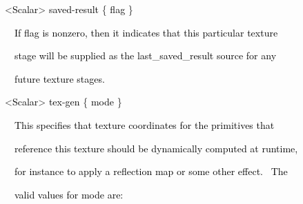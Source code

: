 \documentclass[a4paper]{article}
\newcommand\textstyleOOoComputerKeyWord[1]{\textrm{\textcolor[rgb]{0.0,0.0,0.5019608}{#1}}}
\newcommand\textstyleOOoAssemblerSpecialChar[1]{\textrm{\textcolor[rgb]{0.0,0.5019608,0.0}{#1}}}
\newcommand\textstyleOOoAssemblerIdent[1]{\textrm{\textcolor{black}{#1}}}
\begin{document}
\bigskip

{\color{black}
\textstyleOOoComputerKeyWord{\textcolor{black}{\ \ }}\textstyleOOoAssemblerSpecialChar{{\textless}}\textstyleOOoAssemblerIdent{Scalar}\textstyleOOoAssemblerSpecialChar{{\textgreater}}\textstyleOOoComputerKeyWord{\textcolor{black}{
}}\textstyleOOoAssemblerIdent{saved}\textstyleOOoAssemblerSpecialChar{{}-}\textstyleOOoAssemblerIdent{result}\textstyleOOoComputerKeyWord{\textcolor{black}{
}}\textstyleOOoAssemblerSpecialChar{\{}\textstyleOOoComputerKeyWord{\textcolor{black}{
}}\textstyleOOoAssemblerIdent{flag}\textstyleOOoComputerKeyWord{\textcolor{black}{
}}\textstyleOOoAssemblerSpecialChar{\}}}


\bigskip

{\color{black}
\textstyleOOoComputerKeyWord{\textcolor{black}{\ \ \ \ If flag is nonzero, then it indicates that this particular
texture}}}

{\color{black}
\textstyleOOoComputerKeyWord{\textcolor{black}{\ \ \ \ stage will be supplied as the
{\textquotedbl}last\_saved\_result{\textquotedbl} source for any}}}

{\color{black}
\textstyleOOoComputerKeyWord{\textcolor{black}{\ \ \ \ future texture stages.}}}


\bigskip

{\color{black}
\textstyleOOoComputerKeyWord{\textcolor{black}{\ \ }}\textstyleOOoAssemblerSpecialChar{{\textless}}\textstyleOOoAssemblerIdent{Scalar}\textstyleOOoAssemblerSpecialChar{{\textgreater}}\textstyleOOoComputerKeyWord{\textcolor{black}{
}}\textstyleOOoAssemblerIdent{tex}\textstyleOOoAssemblerSpecialChar{{}-}\textstyleOOoAssemblerIdent{gen}\textstyleOOoComputerKeyWord{\textcolor{black}{
}}\textstyleOOoAssemblerSpecialChar{\{}\textstyleOOoComputerKeyWord{\textcolor{black}{
}}\textstyleOOoAssemblerIdent{mode}\textstyleOOoComputerKeyWord{\textcolor{black}{
}}\textstyleOOoAssemblerSpecialChar{\}}}


\bigskip

{\color{black}
\textstyleOOoComputerKeyWord{\textcolor{black}{\ \ \ \ This specifies that texture coordinates for the primitives
that}}}

{\color{black}
\textstyleOOoComputerKeyWord{\textcolor{black}{\ \ \ \ reference this texture should be dynamically computed at
runtime,}}}

{\color{black}
\textstyleOOoComputerKeyWord{\textcolor{black}{\ \ \ \ for instance to apply a reflection map or some other effect.
\ The}}}

{\color{black}
\textstyleOOoComputerKeyWord{\textcolor{black}{\ \ \ \ valid values for mode are:}}}
\end{document}
